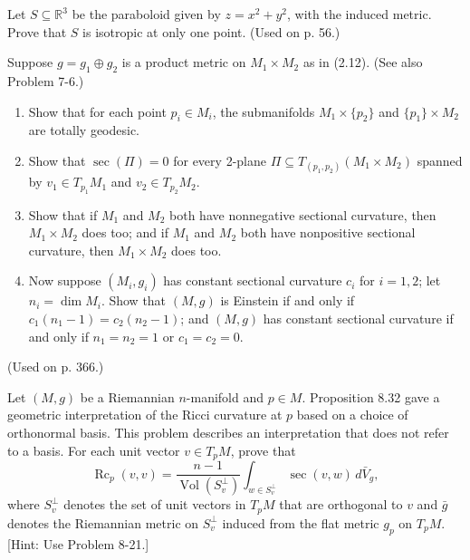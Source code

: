 \begin{exercise}
\label{prob:paraboloid-isotropic-one-point}

Let $S \subseteq \mathbb{R}^3$ be the paraboloid given by $z = x^2 + y^2$, with the induced metric. Prove that $S$ is isotropic at only one point. (Used on p. 56.)
\end{exercise}

\begin{exercise}
\label{prob:product-metric-submanifolds}
Suppose $g = g_1 \oplus g_2$ is a product metric on $M_1 \times M_2$ as in (2.12). (See also Problem 7-6.)

\begin{enumerate}
\item[(a)] Show that for each point $p_i \in M_i$, the submanifolds $M_1 \times \{p_2\}$ and $\{p_1\} \times M_2$ are totally geodesic.

\item[(b)] Show that $\sec(\Pi) = 0$ for every 2-plane $\Pi \subseteq T_{(p_1,p_2)}(M_1 \times M_2)$ spanned by $v_1 \in T_{p_1} M_1$ and $v_2 \in T_{p_2} M_2$.

\item[(c)] Show that if $M_1$ and $M_2$ both have nonnegative sectional curvature, then $M_1 \times M_2$ does too; and if $M_1$ and $M_2$ both have nonpositive sectional curvature, then $M_1 \times M_2$ does too.

\item[(d)] Now suppose $(M_i, g_i)$ has constant sectional curvature $c_i$ for $i = 1,2$; let $n_i = \dim M_i$. Show that $(M, g)$ is Einstein if and only if $c_1(n_1 - 1) = c_2(n_2 - 1)$; and $(M, g)$ has constant sectional curvature if and only if $n_1 = n_2 = 1$ or $c_1 = c_2 = 0$.
\end{enumerate}

(Used on p. 366.)
\end{exercise}

\begin{exercise}
\label{prob:ricci-curvature-without-basis}

Let $(M, g)$ be a Riemannian $n$-manifold and $p \in M$. Proposition 8.32 gave a geometric interpretation of the Ricci curvature at $p$ based on a choice of orthonormal basis. This problem describes an interpretation that does not refer to a basis. For each unit vector $v \in T_p M$, prove that
\[
\operatorname{Rc}_p(v, v) = \frac{n-1}{\operatorname{Vol}(S_v^{\perp})} \int_{w \in S_v^{\perp}} \sec(v, w) \, d\bar{V}_g,
\]
where $S_v^{\perp}$ denotes the set of unit vectors in $T_p M$ that are orthogonal to $v$ and $\bar{g}$ denotes the Riemannian metric on $S_v^{\perp}$ induced from the flat metric $g_p$ on $T_p M$. [Hint: Use Problem 8-21.]
\end{exercise}

